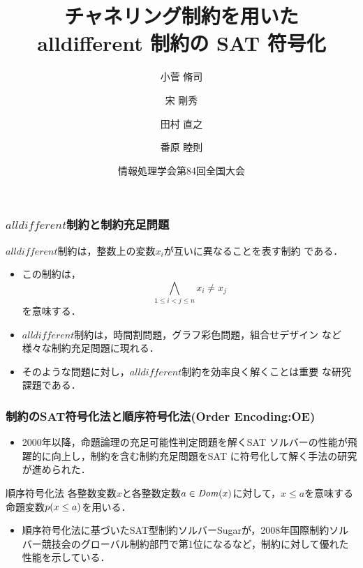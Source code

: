 \documentclass [dvipdfmx,11pt]{beamer}
\title{チャネリング制約を用いた\\ alldifferent 制約の SAT 符号化}
\author{小菅 脩司\inst{1} \and 宋 剛秀\inst{2} \and 田村 直之\inst{2} \and 番原 睦則\inst{1}}
\institute{ \inst{1}名古屋大学 \ \  \inst{2}神戸大学 }
\date{情報処理学会第84回全国大会}
\newcommand{\alldifferent}{$alldifferent$}
\begin{document}
\begin{frame} {}
    \titlepage
\end{frame}




\begin{frame}
    \frametitle{{\alldifferent}制約と制約充足問題}
    \begin{alertblock}{}
        {\alldifferent}制約は，整数上の変数$x_{i}$が互いに異なることを表す制約
        である．
    \end{alertblock}
    \begin{itemize}
        \item この制約は，
            $$\bigwedge_{1 \leq i < j \leq n} x_i \neq x_j$$
            を意味する．
        \item {\alldifferent}制約は，時間割問題，グラフ彩色問題，組合せデザイン
            など様々な制約充足問題に現れる．
        \item そのような問題に対し，{\alldifferent}制約を効率良く解くことは重要
            な研究課題である．
    \end{itemize}
\end{frame}




\begin{frame}
    \frametitle{{\alldiff}制約のSAT符号化法と順序符号化法(Order Encoding:OE)}
    \begin{itemize}
        \item 2000年以降，命題論理の充足可能性判定問題を解くSAT ソルバーの性能が飛躍的に向上し，{\alldiff}制約を含む制約充足問題をSAT に符号化して解く手法の研究が進められた．
    \end{itemize}
    \begin{alertblock}{順序符号化法}
        各整数変数$x$と各整数定数$a \in {\it Dom}(x)$に対して，$x \le a$を意味する命題変数\alert{\bf $p(x\le a)$}を用いる．
    \end{alertblock}
    \begin{itemize}
        \item 順序符号化法に基づいたSAT型制約ソルバーSugarが，2008年国際制約ソルバー競技会のグローバル制約部門で第1位になるなど，{\alldiff}制約に対して優れた性能を示している．
    \end{itemize}
\end{frame}
\end{document}
